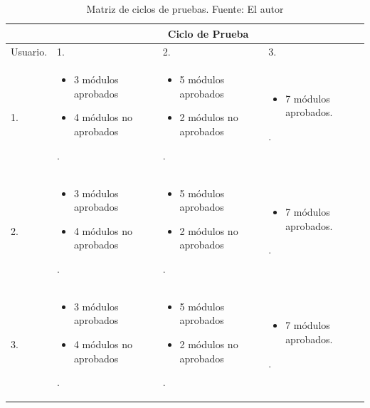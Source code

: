 \begin{table}[H]	
\begin{center}
\begin{tabular}{ | m{2cm} | m{4.5cm} | m{4.5cm}| m{4.5cm}| } 
 \hline
  & \multicolumn{3}{|c|}{Ciclo de Prueba}  \\
 \hline
 Usuario. & 1. & 2. & 3.\\
 \hline
 1. 
 & 
 \begin{itemize}
 	\item 3 módulos aprobados
 	\item 4 módulos no aprobados
 \end{itemize}. 
 & 
 \begin{itemize}
 	\item 5 módulos aprobados
 	\item 2 módulos no aprobados
 \end{itemize}.
 & 
 \begin{itemize}
 	\item 7 módulos aprobados.
 \end{itemize}.\\
 \hline
 2. 
 & 
 \begin{itemize}
 	\item 3 módulos aprobados
 	\item 4 módulos no aprobados
 \end{itemize}. 
 & 
 \begin{itemize}
 	\item 5 módulos aprobados
 	\item 2 módulos no aprobados
 \end{itemize}.
 & 
 \begin{itemize}
 	\item 7 módulos aprobados.
 \end{itemize}.\\
 \hline
 3. 
 & 
 \begin{itemize}
 	\item 3 módulos aprobados
 	\item 4 módulos no aprobados
 \end{itemize}. 
 & 
 \begin{itemize}
 	\item 5 módulos aprobados
 	\item 2 módulos no aprobados
 \end{itemize}.
 & 
 \begin{itemize}
 	\item 7 módulos aprobados.
 \end{itemize}.\\
 \hline
\end{tabular}
\caption{Matriz de ciclos de pruebas. Fuente: El autor}
\label{Tabla:7}
\end{center}
\end{table}


